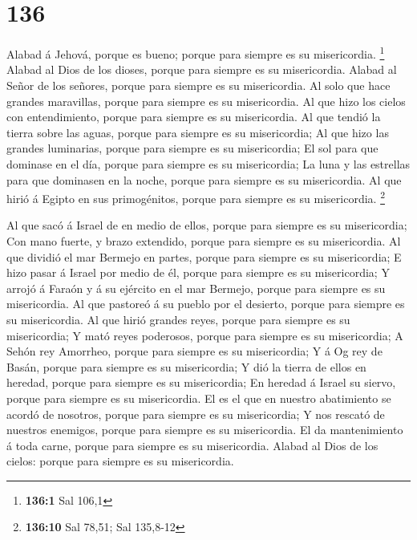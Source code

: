 \hypertarget{section-135}{%
\section{136}\label{section-135}}

 Alabad á Jehová, porque es bueno; porque para siempre es su
misericordia. \footnote{\textbf{136:1} Sal 106,1}  Alabad al
Dios de los dioses, porque para siempre es su misericordia. 
Alabad al Señor de los señores, porque para siempre es su misericordia.
 Al solo que hace grandes maravillas, porque para siempre es
su misericordia.  Al que hizo los cielos con entendimiento,
porque para siempre es su misericordia.  Al que tendió la
tierra sobre las aguas, porque para siempre es su misericordia;
 Al que hizo las grandes luminarias, porque para siempre es
su misericordia;  El sol para que dominase en el día, porque
para siempre es su misericordia;  La luna y las estrellas
para que dominasen en la noche, porque para siempre es su misericordia.
 Al que hirió á Egipto en sus primogénitos, porque para
siempre es su misericordia. \footnote{\textbf{136:10} Sal 78,51; Sal
  135,8-12}

 Al que sacó á Israel de en medio de ellos, porque para
siempre es su misericordia;  Con mano fuerte, y brazo
extendido, porque para siempre es su misericordia.  Al que
dividió el mar Bermejo en partes, porque para siempre es su
misericordia;  E hizo pasar á Israel por medio de él,
porque para siempre es su misericordia;  Y arrojó á Faraón
y á su ejército en el mar Bermejo, porque para siempre es su
misericordia.  Al que pastoreó á su pueblo por el desierto,
porque para siempre es su misericordia.  Al que hirió
grandes reyes, porque para siempre es su misericordia;  Y
mató reyes poderosos, porque para siempre es su misericordia;
 A Sehón rey Amorrheo, porque para siempre es su
misericordia;  Y á Og rey de Basán, porque para siempre es
su misericordia;  Y dió la tierra de ellos en heredad,
porque para siempre es su misericordia;  En heredad á
Israel su siervo, porque para siempre es su misericordia. 
El es el que en nuestro abatimiento se acordó de nosotros, porque para
siempre es su misericordia;  Y nos rescató de nuestros
enemigos, porque para siempre es su misericordia.  El da
mantenimiento á toda carne, porque para siempre es su misericordia.
 Alabad al Dios de los cielos: porque para siempre es su
misericordia.

